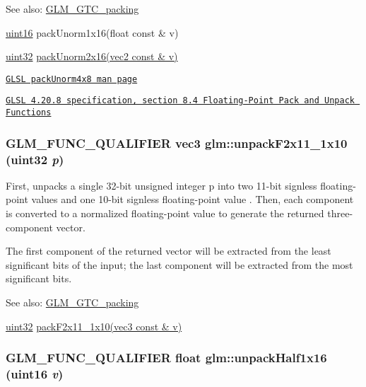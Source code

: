 \begin{Desc}
\item[See also:]\hyperlink{group__gtc__packing}{GLM\_\-GTC\_\-packing} 

\hyperlink{group__gtc__type__precision_gd8c2939e1fdd8e5828b31d95c52255d5}{uint16} packUnorm1x16(float const \& v) 

\hyperlink{group__gtc__type__precision_g202b6a53c105fcb7e531f9b443518451}{uint32} \hyperlink{group__core__func__packing_g0659ddaf09727551c7bf51655d2a65cf}{packUnorm2x16(vec2 const \& v)} 

\href{http://www.opengl.org/sdk/docs/manglsl/xhtml/packUnorm4x8.xml}{\tt GLSL packUnorm4x8 man page} 

\href{http://www.opengl.org/registry/doc/GLSLangSpec.4.20.8.pdf}{\tt GLSL 4.20.8 specification, section 8.4 Floating-Point Pack and Unpack Functions} \end{Desc}
\hypertarget{group__gtc__packing_g8b9c7991eb021d95c778bf5c0b2f7824}{
\subsubsection[unpackF2x11\_\-1x10]{\setlength{\rightskip}{0pt plus 5cm}GLM\_\-FUNC\_\-QUALIFIER vec3 glm::unpackF2x11\_\-1x10 (uint32 {\em p})}}
\label{group__gtc__packing_g8b9c7991eb021d95c778bf5c0b2f7824}


First, unpacks a single 32-bit unsigned integer p into two 11-bit signless floating-point values and one 10-bit signless floating-point value . Then, each component is converted to a normalized floating-point value to generate the returned three-component vector.

The first component of the returned vector will be extracted from the least significant bits of the input; the last component will be extracted from the most significant bits.

\begin{Desc}
\item[See also:]\hyperlink{group__gtc__packing}{GLM\_\-GTC\_\-packing} 

\hyperlink{group__gtc__type__precision_g202b6a53c105fcb7e531f9b443518451}{uint32} \hyperlink{group__gtc__packing_g8c2a0eeee677ca4dafd9e093d9e81062}{packF2x11\_\-1x10(vec3 const \& v)} \end{Desc}
\hypertarget{group__gtc__packing_ga6eebcdfc746584b7d1823f1d5344fed}{
\subsubsection[unpackHalf1x16]{\setlength{\rightskip}{0pt plus 5cm}GLM\_\-FUNC\_\-QUALIFIER float glm::unpackHalf1x16 (uint16 {\em v})}}
\label{group__gtc__packing_ga6eebcdfc746584b7d1823f1d5344fed}


